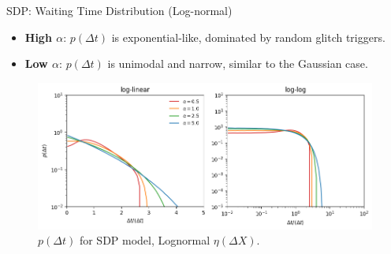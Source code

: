 \begin{frame}{SDP: Waiting Time Distribution (Log-normal)}
    \setlength{\leftmargini}{0.5em}
    \small
    \vspace{-0.5em}
    \begin{itemize}
        \item \textbf{High $\alpha$}: $p(\Delta t)$ is exponential-like, dominated by random glitch triggers.
        \item \textbf{Low $\alpha$}: $p(\Delta t)$ is unimodal and narrow, similar to the Gaussian case.
    \end{itemize}
    
    \vspace{-0.5em}
    \begin{figure}
        \centering
        \includegraphics[width=0.85\linewidth]{assets/wtd_lognormal_sdp.png}
        \vspace{-1em}
        \caption{$p(\Delta t)$ for SDP model, Lognormal $\eta(\Delta X)$.}
    \end{figure}
\end{frame}